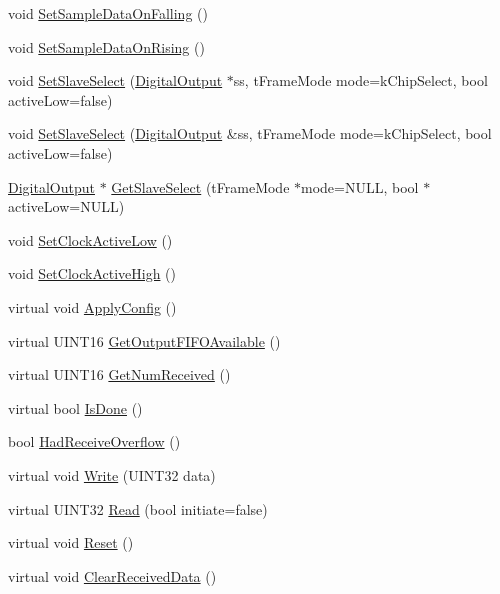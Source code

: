 \begin{DoxyCompactItemize}
\item 
void \hyperlink{classSPI_a463dc7cb26d0b865c44c73538bc23ae0}{\-Set\-Sample\-Data\-On\-Falling} ()
\item 
void \hyperlink{classSPI_a00eec7d4310c18e8cfb4b36592b488d9}{\-Set\-Sample\-Data\-On\-Rising} ()
\item 
void \hyperlink{classSPI_af0a6cd80fbc758c2a8e344f044e1a59d}{\-Set\-Slave\-Select} (\hyperlink{classDigitalOutput}{\-Digital\-Output} $\ast$ss, t\-Frame\-Mode mode=k\-Chip\-Select, bool active\-Low=false)
\item 
void \hyperlink{classSPI_ad2745d268c7350f65d4657b6d558a67a}{\-Set\-Slave\-Select} (\hyperlink{classDigitalOutput}{\-Digital\-Output} \&ss, t\-Frame\-Mode mode=k\-Chip\-Select, bool active\-Low=false)
\item 
\hyperlink{classDigitalOutput}{\-Digital\-Output} $\ast$ \hyperlink{classSPI_a614dfabba0dcbb66d6c1a88ba40bd26c}{\-Get\-Slave\-Select} (t\-Frame\-Mode $\ast$mode=\-N\-U\-L\-L, bool $\ast$active\-Low=\-N\-U\-L\-L)
\item 
void \hyperlink{classSPI_aa1b8cb48216e0a502bb34486636da047}{\-Set\-Clock\-Active\-Low} ()
\item 
void \hyperlink{classSPI_a5581a5f70c8e49dd712d44f40ee81e6f}{\-Set\-Clock\-Active\-High} ()
\item 
virtual void \hyperlink{classSPI_a660a95177a0e69be2ae3b0f5ace85d2c}{\-Apply\-Config} ()
\item 
virtual \-U\-I\-N\-T16 \hyperlink{classSPI_a9154529287b4995e403ed110e76963cd}{\-Get\-Output\-F\-I\-F\-O\-Available} ()
\item 
virtual \-U\-I\-N\-T16 \hyperlink{classSPI_ab4de7fc2759b427c33af1aa0d79b1973}{\-Get\-Num\-Received} ()
\item 
virtual bool \hyperlink{classSPI_a88ae50d03a0aeecac3045a4d5ca7fb81}{\-Is\-Done} ()
\item 
bool \hyperlink{classSPI_aec0f909f191fec08bb1a069bdb35fd8e}{\-Had\-Receive\-Overflow} ()
\item 
virtual void \hyperlink{classSPI_a231184061058fc3924e0d5e3abb0dcb1}{\-Write} (\-U\-I\-N\-T32 data)
\item 
virtual \-U\-I\-N\-T32 \hyperlink{classSPI_a748b582c349402ddc4ea0fb0034b00b3}{\-Read} (bool initiate=false)
\item 
virtual void \hyperlink{classSPI_a19bcc2d6206a4c54a62cd0a358ef1d1a}{\-Reset} ()
\item 
virtual void \hyperlink{classSPI_ae70ffd5d8cd8f973b9fc2103d2ee3474}{\-Clear\-Received\-Data} ()
\end{DoxyCompactItemize}
